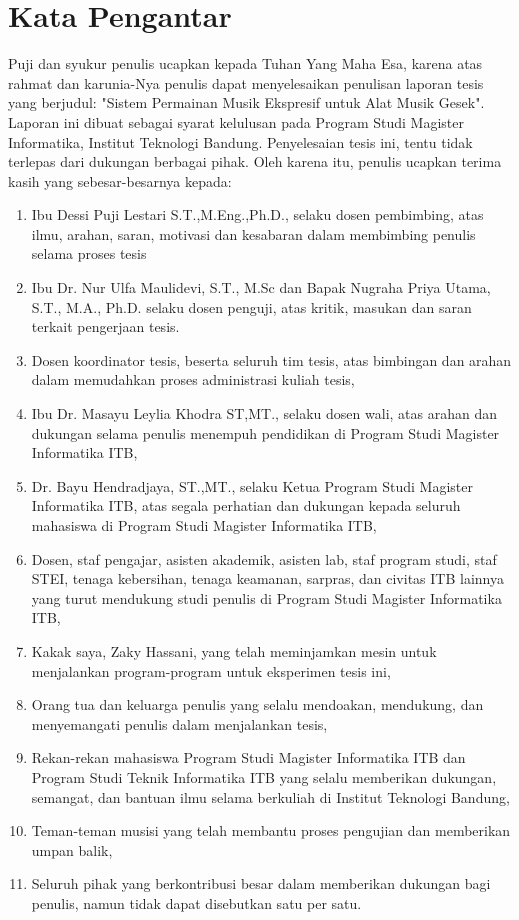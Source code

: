 \chapter*{Kata Pengantar}

Puji dan syukur penulis ucapkan kepada Tuhan Yang Maha Esa, karena atas rahmat dan karunia-Nya penulis dapat menyelesaikan penulisan laporan tesis yang berjudul: "Sistem Permainan Musik Ekspresif untuk Alat Musik Gesek". Laporan ini dibuat sebagai syarat kelulusan pada Program Studi Magister Informatika, Institut Teknologi Bandung. Penyelesaian tesis ini, tentu tidak terlepas dari dukungan berbagai pihak. Oleh karena itu, penulis ucapkan terima kasih yang sebesar-besarnya kepada:

\begin{enumerate}
\item Ibu Dessi Puji Lestari S.T.,M.Eng.,Ph.D., selaku dosen pembimbing, atas ilmu, arahan, saran, motivasi dan kesabaran dalam membimbing penulis selama proses tesis
\item Ibu Dr. Nur Ulfa Maulidevi, S.T., M.Sc dan Bapak Nugraha Priya Utama, S.T., M.A., Ph.D. selaku dosen penguji, atas kritik, masukan dan saran terkait pengerjaan tesis. %
% 
\item %
Dosen koordinator tesis, beserta seluruh tim tesis, atas bimbingan dan arahan dalam memudahkan proses administrasi kuliah tesis,
\item Ibu Dr. Masayu Leylia Khodra ST,MT., selaku dosen wali, atas arahan dan dukungan selama penulis menempuh pendidikan di Program Studi Magister Informatika ITB,
\item Dr. Bayu Hendradjaya, ST.,MT., selaku Ketua Program Studi Magister Informatika ITB, atas segala perhatian dan dukungan kepada seluruh mahasiswa di Program Studi Magister Informatika ITB,
\item Dosen, staf pengajar, asisten akademik, asisten lab, staf program studi, staf STEI, tenaga kebersihan, tenaga keamanan, sarpras, dan civitas ITB lainnya yang turut mendukung studi penulis di Program Studi Magister Informatika ITB,
\item Kakak saya, Zaky Hassani, yang telah meminjamkan mesin untuk menjalankan program-program untuk eksperimen tesis ini,
\item Orang tua dan keluarga penulis yang selalu mendoakan, mendukung, dan menyemangati penulis dalam menjalankan tesis,
\item Rekan-rekan mahasiswa Program Studi Magister Informatika ITB dan Program Studi Teknik Informatika ITB yang selalu memberikan dukungan, semangat, dan bantuan ilmu selama berkuliah di Institut Teknologi Bandung,
\item Teman-teman musisi yang telah membantu proses pengujian dan memberikan umpan balik,
\item Seluruh pihak yang berkontribusi besar dalam memberikan dukungan bagi penulis, namun tidak dapat disebutkan satu per satu.
\end{enumerate}

